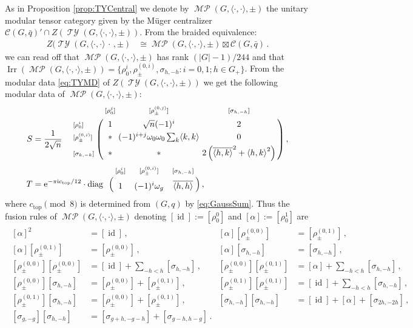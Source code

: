 \documentclass[twoside,11pt,reqno]{amsart}
\theoremstyle{definition}
\theoremstyle{remark}
\newcommand{\slot}{{~\cdot~}}
\newcommand{\cC}{\mathcal{C}}
\DeclareMathOperator{\diag}{diag}
\DeclareMathOperator{\id}{id}
\newcommand{\e}{\mathrm{e}}
\newcommand{\ima}{\mathrm{i}}
\DeclareMathOperator*{\TY}{\mathcal{TY}}
\DeclareMathOperator*{\MP}{\mathcal{MP}}
\DeclareMathOperator{\Irr}{Irr}
\newcommand{\bi}[2]{\langle #1,#2\rangle}
\renewcommand{\slot}{\,\cdot\,}
\newcommand{\bislotslot}{\bi\cdot\cdot}
\begin{document}
As in Proposition \ref{prop:TYCentral} we denote by $\MP(G,\bislotslot,\pm)$
the unitary modular tensor category given by the Müger centralizer 
$\cC(G,\bar q)'\cap Z(\TY(G,\bislotslot,\pm))$.
From the braided equivalence:
%
%
%
%
%
%
\begin{align} 
  Z(\TY(G,\bislotslot\slot,\pm) & \cong\MP(G,\bislotslot,\pm)\boxtimes \cC(G,\bar q)\,.
\end{align}
we can read off that 
$\MP(G,\bislotslot,\pm)$ has rank $(|G|-1)/244$
and that
$\Irr(\MP(G,\bislotslot,\pm)) 
  =\{ \rho_0^i,\rho^{(0,i)}_\pm,\sigma_{h,-h} : i=0,1 ; h\in G_+\}$.
From the modular data \eqref{eq:TYMD}
%
of $Z(\TY(G,\bislotslot,\pm))$ we get
the following modular data of $\MP(G,\bislotslot,\pm)$:
\begin{subequations}
\begin{align}
  S&=\frac1{2\sqrt n}\quad
  \bordermatrix{
    &\scriptstyle[\rho^j_0] & \scriptstyle[\rho_\pm^{(0,j)}] &\scriptstyle[\sigma_{h,-h}]\cr
    \scriptstyle[\rho^i_0] &1&\sqrt n (-1)^i &2 \cr
    \scriptstyle[\rho_\pm^{(0,i)}]&\ast &\!\!\!\!(-1)^{i+j}\omega_0\omega_0\sum_k\bi kk\!\!\!\!&0\cr
    \scriptstyle[\sigma_{k,-k}]&\ast&\ast &2\left(\overline{\bi h k}^2+{\bi hk}^2\right)
  }\,,\\
  T&= \e^{-\pi\ima c_{\mathrm{top}}/12} \cdot \diag 
  \bordermatrix{
    & \scriptstyle[\rho^i_0] & \scriptstyle[\rho_\pm^{(0,i)}] &\scriptstyle[\sigma_{h,-h}]\cr
    \!\!\!\! &1  & (-1)^i\omega_g
     & \overline{\bi hh}
  }\,,
\end{align}
\end{subequations}
where $c_{\mathrm{top}} \pmod 8$ is determined from $(G,q)$ by 
\eqref{eq:GaussSum}.
%
%
%
%
Thus the fusion rules of $\MP(G,\bislotslot,\pm)$ denoting 
$[\id]:= [\rho_0^0]$ and $[\alpha]:= [\rho_0^1]$ are
\begin{gather}
  \begin{aligned}
    [\alpha ]^2 &= [\id]\,, &
    [\alpha][\rho_\pm^{(0,0)}]&= [\rho_\pm^{(0,1)}]\,,\\
    [\alpha][\rho_\pm^{(0,1)}]&= [\rho_\pm^{(0,0)}]\,,&
    [\alpha][\sigma_{h,-h}]&= [\sigma_{h,-h}]\,,\\ 
    [\rho_\pm^{(0,0)}][\rho_\pm^{(0,0)}]&=[\id]+\sum_{-h<h} [\sigma_{h,-h}]\,,&
    [\rho_\pm^{(0,0)}][\rho_\pm^{(0,1)}]&=[\alpha]+\sum_{-h<h} [\sigma_{h,-h}]\,,\\
    [\rho_\pm^{(0,0)}][\sigma_{h,-h}]&=[\rho_\pm^{(0,0)}]+[\rho_\pm^{(0,1)}]\,,&
    [\rho_\pm^{(0,1)}][\rho_\pm^{(0,1)}]&=[\id]+\sum_{-h<h} [\sigma_{h,-h}]\,,\\
    [\rho_\pm^{(0,1)}][\sigma_{h,-h}]&=[\rho_\pm^{(0,0)}]+[\rho_\pm^{(0,1)}]\,,&
    [\sigma_{h,-h}][\sigma_{h,-h}]&=[\id]+[\alpha]+[\sigma_{2h,-2h}]\,,\\ 
    [\sigma_{g,-g}][\sigma_{h,-h}]&=[\sigma_{g+h,-g-h}]+ [\sigma_{g-h,h-g}]\,.
\end{aligned}
\end{gather}
\end{document}
